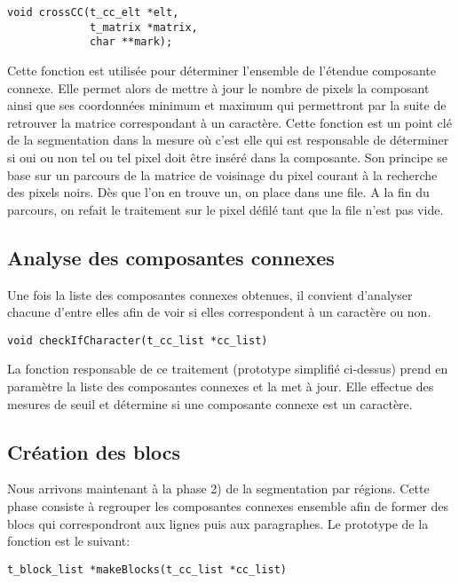 \documentclass[a4paper,10pt]{report}
\begin{document}
\begin{lstlisting}
void crossCC(t_cc_elt *elt,
             t_matrix *matrix,
             char **mark);
\end{lstlisting}

Cette fonction est utilisée pour déterminer l'ensemble de l'étendue
composante connexe. Elle permet alors de mettre à jour le nombre de
pixels la composant ainsi que ses coordonnées minimum et maximum qui
permettront par la suite de retrouver la matrice correspondant à un
caractère.
Cette fonction est un point clé de la segmentation dans la mesure où
c'est elle qui est responsable de déterminer si oui ou non tel ou tel
pixel doit être inséré dans la composante.
Son principe se base sur un parcours de la matrice de voisinage du pixel
courant à la recherche des pixels noirs. Dès que l'on en trouve un, on
place dans une file. A la fin du parcours, on refait le traitement sur
le pixel défilé tant que la file n'est pas vide.


\subsection{Analyse des composantes connexes}
Une fois la liste des composantes connexes obtenues, il convient
d'analyser chacune d'entre elles afin de voir si elles correspondent à
un caractère ou non.

\begin{lstlisting}
void checkIfCharacter(t_cc_list *cc_list)
\end{lstlisting}

La fonction responsable de ce traitement (prototype simplifié ci-dessus)
prend en paramètre la liste des composantes connexes et la met à jour.
Elle effectue des mesures de seuil et détermine si une composante
connexe est un caractère.



\subsection{Création des blocs}
Nous arrivons maintenant à la phase 2) de la segmentation par régions.
Cette phase consiste à regrouper les composantes connexes ensemble afin
de former des blocs qui correspondront aux lignes puis aux paragraphes.
Le prototype de la fonction est le suivant:

\begin{lstlisting}
t_block_list *makeBlocks(t_cc_list *cc_list)
\end{lstlisting}
\end{document}
